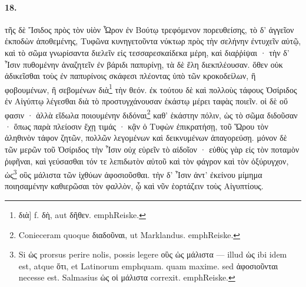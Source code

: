 \documentclass[a4paper, 11pt, oneside, polutonikogreek, german]{article}
\begin{document}
\paragraph{18.}
τῆς δὲ Ἴσιδος πρὸς τὸν υἱὸν Ὧρον ἐν Βούτῳ τρεφόμενον πορευθείσης, τὸ δ' ἀγγεῖον ἐκποδὼν ἀποθεμένης, Τυφῶνα κυνηγετοῦντα νύκτωρ πρὸς τὴν σελήνην ἐντυχεῖν αὐτῷ, καὶ τὸ σῶμα γνωρίσαντα διελεῖν εἰς τεσσαρεσκαίδεκα μέρη, καὶ διαῤῥίψαι · τὴν δ' Ἶσιν πυθομένην ἀναζητεῖν ἐν βάριδι παπυρίνῃ, τὰ δὲ ἕλη διεκπλέουσαν. ὅθεν οὐκ ἀδικεῖσθαι τοὺς ἐν παπυρίνοις σκάφεσι πλέοντας ὑπὸ τῶν κροκοδείλων, ἢ φοβουμένων, ἢ σεβομένων διὰ\footnote{διὰ] f. δὴ, aut δῆθεν. emph{Reiske.}} τὴν θεόν. ἐκ τούτου δὲ καὶ πολλοὺς τάφους Ὀσίριδος ἐν Αἰγύπτῳ λέγεσθαι διὰ τὸ προστυγχάνουσαν ἑκάστῳ μέρει ταφὰς ποιεῖν. οἱ δὲ οὔ φασιν · ἀλλὰ εἴδωλα ποιουμένην διδόναι\footnote{Conieceram quoque διαδοῦναι, ut Marklandus. emph{Reiske.}} καθ' ἑκάστην πόλιν, ὡς τὸ σῶμα διδοῦσαν · ὅπως παρὰ πλείοσιν ἔχῃ τιμάς · κᾂν ὁ Τυφὼν ἐπικρατήσῃ, τοῦ Ὥρου τὸν ἀληθινὸν τάφον ζητῶν, πολλῶν λεγομένων καὶ δεικνυμένων ἀπαγορεύσῃ. μόνον δὲ τῶν μερῶν τοῦ Ὀσίριδος τὴν Ἶσιν οὐχ εὑρεῖν τὸ αἰδοῖον · εὐθὺς γὰρ εἰς τὸν ποταμὸν ῥιφῆναι, καὶ γεύσασθαι τόν τε λεπιδωτὸν αὐτοῦ καὶ τὸν φάγρον καὶ τὸν ὀξύρυγχον, ὡς\footnote{Si ὡς prorsus perire nolis, possis legere οὓς ὡς μάλιστα --- illud ὡς ibi idem est, atque ὅτι, et Latinorum emph{quam. quam maxime.} sed ἀφοσιοῦνται necesse est. Salmasius ὡς οἱ μάλιστα correxit. emph{Reiske.}} οὓς μάλιστα τῶν ἰχθύων ἀφοσιοῦσθαι. τὴν δ' Ἶσιν ἀντ' ἐκείνου μίμημα ποιησαμένην καθιερῶσαι τὸν φαλλὸν, ᾧ καὶ νῦν ἑορτάζειν τοὺς Αἰγυπτίους.
\end{document}

